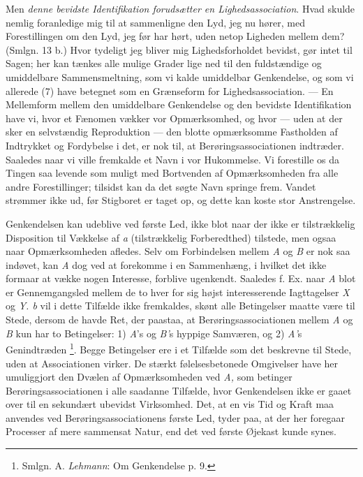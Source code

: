 \documentclass[12pt,a4paper,openany]{book}
\newcommand{\opage}[1]{\marginnote{\footnotesize\textit{[#1]}}}
\begin{document}
Men \emph{denne bevidste Identifikation forudsætter en Lighedsassociation}.
Hvad skulde nemlig foranledige mig til at sammenligne den Lyd, jeg nu hører,
med Forestillingen om den Lyd, jeg før har hørt, uden netop Ligheden mellem
dem? (Smlgn. 13 b.) Hvor tydeligt jeg bliver mig Lighedsforholdet bevidst, gør
intet til Sagen; her kan tænkes alle mulige Grader lige ned til den
fuldstændige og umiddelbare Sammensmeltning, som vi kalde umiddelbar
Genkendelse, og som vi allerede (7) have betegnet som en Grænseform for
Lighedsassociation. --- En Mellemform mellem den umiddelbare Genkendelse og den
bevidste Identifikation have vi, hvor et Fænomen vækker vor Opmærksomhed, og
hvor --- uden at der sker en selvstændig Reproduktion --- den blotte
opmærksomme Fastholden af
\setcounter{footnote}{0}%
\opage{39}Indtrykket og Fordybelse i det, er nok til, at Berøringsassociationen
indtræder. Saaledes naar vi ville fremkalde et Navn i vor Hukommelse. Vi
forestille os da Tingen saa levende som muligt med Bortvenden af Opmærksomheden
fra alle andre Forestillinger; tilsidst kan da det søgte Navn springe frem.
Vandet strømmer ikke ud, før Stigboret er taget op, og dette kan koste stor
Anstrengelse.

Genkendelsen kan udeblive ved første Led, ikke blot naar der ikke er
tilstrækkelig Disposition til Vækkelse af \textit{a} (tilstrækkelig
Forberedthed) tilstede, men ogsaa naar Opmærksomheden afledes. Selv om
Forbindelsen mellem \textit{A} og \textit{B} er nok saa indøvet, kan \textit{A}
dog ved at forekomme i en Sammenhæng, i hvilket det ikke formaar at vække nogen
Interesse, forblive ugenkendt. Saaledes f. Ex. naar \textit{A} blot er
Gennemgangsled mellem de to hver for sig højst interesserende Iagttagelser
\textit{X} og \textit{Y. b} vil i dette Tilfælde ikke fremkaldes, skønt alle
Betingelser maatte være til Stede, dersom de havde Ret, der paastaa, at
Berøringsassociationen mellem \textit{A} og \textit{B} kun har to Betingelser:
1) \textit{A}'s og \textit{B'}s hyppige Samværen, og 2) \textit{A'}s Genindtræden%
\footnote[1]{Smlgn. A. \emph{Lehmann}: Om Genkendelse p. 9.}. Begge Betingelser
ere i et Tilfælde som det beskrevne til Stede, uden at Associationen virker. De
stærkt følelsesbetonede Omgivelser have her umuliggjort den Dvælen af
Opmærksomheden ved \textit{A,} som betinger Berøringsassociationen i alle
saadanne Tilfælde, hvor Genkendelsen ikke er gaaet over til en sekundært
ubevidst Virksomhed. Det, at en vis Tid og Kraft maa anvendes ved
Berøringsassociationens første Led, tyder paa, at der her foregaar Processer af
mere sammensat Natur, end det ved første Øjekast kunde synes.
\end{document}
